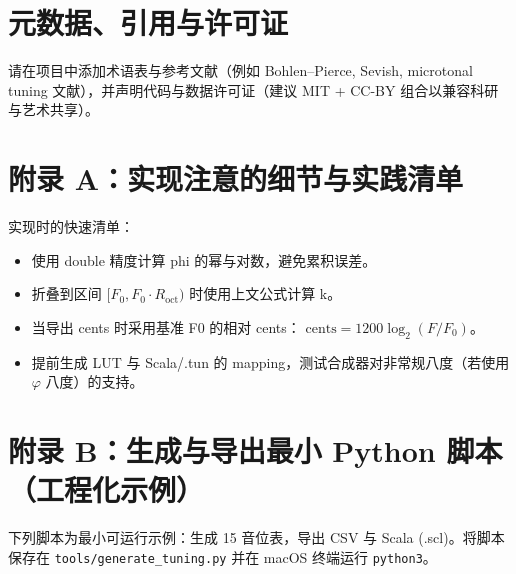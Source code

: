 \documentclass{article}
\begin{document}
\section{元数据、引用与许可证}
请在项目中添加术语表与参考文献（例如 Bohlen–Pierce, Sevish, microtonal tuning 文献），并声明代码与数据许可证（建议 MIT + CC-BY 组合以兼容科研与艺术共享）。

\section{附录 A：实现注意的细节与实践清单}
实现时的快速清单：
\begin{itemize}
  \item 使用 double 精度计算 phi 的幂与对数，避免累积误差。
  \item 折叠到区间 $[F_0, F_0\cdot R_{\mathrm{oct}})$ 时使用上文公式计算 k。
  \item 当导出 cents 时采用基准 F0 的相对 cents： $\mathrm{cents}=1200\log_2(F/F_0)$。
  \item 提前生成 LUT 与 Scala/.tun 的 mapping，测试合成器对非常规八度（若使用 $\varphi$ 八度）的支持。
\end{itemize}

\section{附录 B：生成与导出最小 Python 脚本（工程化示例）}
下列脚本为最小可运行示例：生成 15 音位表，导出 CSV 与 Scala (.scl)。将脚本保存在 \texttt{tools/generate\_tuning.py} 并在 macOS 终端运行 \texttt{python3}。
\end{document}
